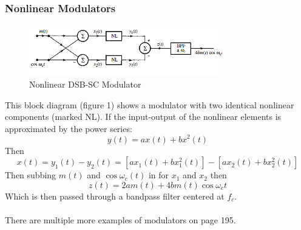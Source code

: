 \documentclass{article}
\begin{document}
    \subsubsection{Nonlinear Modulators}

    \begin{figure}[h]
        \centering
        \includegraphics[width=0.75\textwidth]{nl_mod}
        \caption{Nonlinear DSB-SC Modulator}
    \end{figure}

    This block diagram (figure 1) shows a modulator with two identical nonlinear components (marked NL). If the input-output of the nonlinear elements is 
    approximated by the power series:
    \begin{equation}
        y(t) = ax(t) + bx^2(t)
    \end{equation}
    Then
    \begin{equation}
        x(t) = y_1(t) - y_2(t) = [ax_1(t) + bx_1^2(t)] - [ax_2(t) + bx_2^2(t)]
    \end{equation}
    Then subbing $m(t)$ and $\cos\omega_c(t)$ in for $x_1$ and $x_2$ then
    \begin{equation}
        z(t) = 2am(t) + 4bm(t)\cos\omega_ct
    \end{equation}
    Which is then passed through a bandpass filter centered at $f_c$. \\
    \\
    There are multiple more examples of modulators on page 195. 
\end{document}
